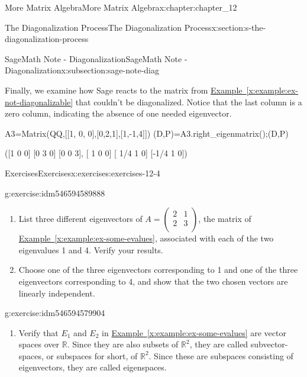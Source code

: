 \documentclass[oneside,10pt,]{book}
\newcommand{\xreffont}{\relax}
\numberwithin{equation}{section}
\begin{document}
\begin{chapterptx}{More Matrix Algebra}{}{More Matrix Algebra}{}{}{x:chapter:chapter_12}
\begin{sectionptx}{The Diagonalization Process}{}{The Diagonalization Process}{}{}{x:section:s-the-diagonalization-process}
\begin{subsectionptx}{SageMath Note - Diagonalization}{}{SageMath Note - Diagonalization}{}{}{x:subsection:sage-note-diag}
\begin{sageoutput}
[ 4.35 0.000 0.000]
[0.000  7.27 0.000]
[0.000 0.000  8.38]
\end{sageoutput}
Finally, we examine how Sage reacts to the matrix from \hyperref[x:example:ex-not-diagonalizable]{Example~{\xreffont\ref{x:example:ex-not-diagonalizable}}} that couldn't be diagonalized.   Notice that the last column is a zero column, indicating the absence of one needed eigenvector.%
\begin{sageinput}
A3=Matrix(QQ,[[1, 0, 0],[0,2,1],[1,-1,4]])
(D,P)=A3.right_eigenmatrix();(D,P)
\end{sageinput}
\begin{sageoutput}
([1 0 0]
[0 3 0]
[0 0 3], 
[   1    0    0]
[ 1/4    1    0]
[-1/4    1    0])
\end{sageoutput}
\end{subsectionptx}
%
%
\typeout{************************************************}
\typeout{************************************************}
%
\begin{exercises-subsection}{Exercises}{}{Exercises}{}{}{x:exercises:exercises-12-4}
\begin{divisionexercise}{1}{}{}{g:exercise:idm546594589888}%
%
\begin{enumerate}[label=(\alph*)]
\item{}List three different eigenvectors of \(A=\left(
\begin{array}{cc}
2 & 1 \\
2 & 3 \\
\end{array}
\right)\), the matrix of \hyperref[x:example:ex-some-evalues]{Example~{\xreffont\ref{x:example:ex-some-evalues}}}, associated with each of the two eigenvalues 1 and 4.   Verify your results.%
\item{}Choose one of the three eigenvectors corresponding to 1 and one of the three eigenvectors corresponding to 4, and show that the two chosen vectors are linearly independent.%
\end{enumerate}
%
\end{divisionexercise}%
\begin{divisionexercise}{2}{}{}{g:exercise:idm546594579904}%
%
\begin{enumerate}[label=(\alph*)]
\item{}Verify that \(E_1\) and \(E_2\) in \hyperref[x:example:ex-some-evalues]{Example~{\xreffont\ref{x:example:ex-some-evalues}}} are vector spaces over \(\mathbb{R}\).  Since they are also subsets of \(\mathbb{R}^2\), they are called subvector-spaces, or subspaces for short, of \(\mathbb{R}^2\). Since these are subspaces consisting of eigenvectors, they are called eigenspaces.%

\end{enumerate}
\end{divisionexercise}
\end{exercises-subsection}
\end{sectionptx}
\end{chapterptx}
\end{document}
